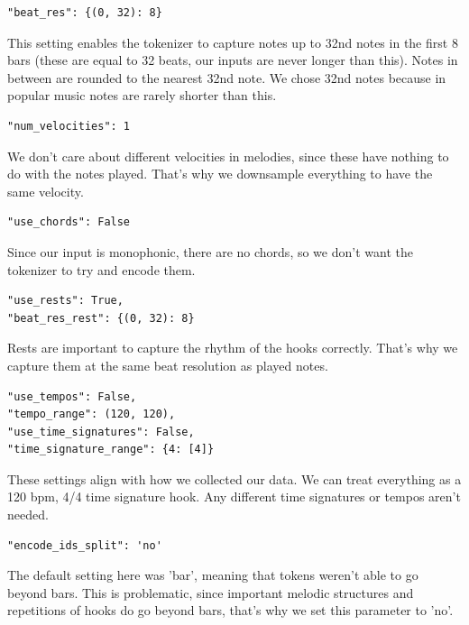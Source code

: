 \documentclass[a4paper,12pt]{extarticle}
\begin{document}
\begin{lstlisting}
"beat_res": {(0, 32): 8}   
\end{lstlisting}
This setting enables the tokenizer to capture notes up to 32nd notes in the first 8 bars (these are equal to 32 beats, our inputs are never longer than this). Notes in between are rounded to the nearest 32nd note. We chose 32nd notes because in popular music notes are rarely shorter than this. \newline
\begin{lstlisting}
"num_velocities": 1
\end{lstlisting}
We don't care about different velocities in melodies, since these have nothing to do with the notes played. That's why we downsample everything to have the same velocity. \newline

\begin{lstlisting}
"use_chords": False
\end{lstlisting}
Since our input is monophonic, there are no chords, so we don't want the tokenizer to try and encode them. \newline

\begin{lstlisting}
"use_rests": True,
"beat_res_rest": {(0, 32): 8}
\end{lstlisting}
Rests are important to capture the rhythm of the hooks correctly. That's why we capture them at the same beat resolution as played notes. \newline

\begin{lstlisting}
"use_tempos": False,
"tempo_range": (120, 120),
"use_time_signatures": False,
"time_signature_range": {4: [4]}
\end{lstlisting}
These settings align with how we collected our data. We can treat everything as a 120 bpm, 4/4 time signature hook. Any different time signatures or tempos aren't needed. \newline

\begin{lstlisting}
"encode_ids_split": 'no'
\end{lstlisting}
The default setting here was 'bar', meaning that tokens weren't able to go beyond bars. This is problematic, since important melodic structures and repetitions of hooks do go beyond bars, that's why we set this parameter to 'no'. \newline
\end{document}

